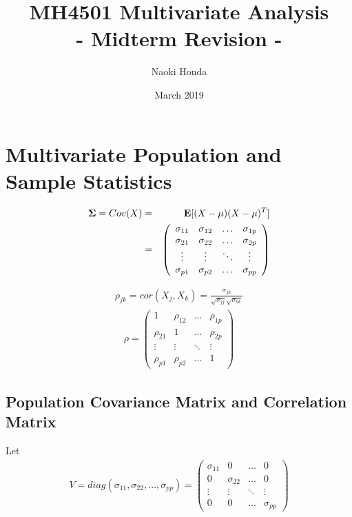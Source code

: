 \documentclass[12pt]{extarticle}
\title{\textbf{MH4501 Multivariate Analysis}\\
\Large - Midterm Revision -}
\author{Naoki Honda}
\date{March 2019}
\newcommand{\<}{\langle}
\renewcommand{\>}{\rangle}
\theoremstyle{definition}
\begin{document}
\maketitle


\section{Multivariate Population and Sample Statistics}
\begin{tcolorbox}[enhanced, drop fuzzy shadow, title=Population Covariance Matrix]
\begin{eqnarray*}
{\bf \Sigma} = Cov(X) &=& {\bf E}[(X-\mu)(X-\mu)^T]\\
&=& \left(
    \begin{array}{cccc}
      \sigma_{11} & \sigma_{12} & \ldots & \sigma_{1p} \\
      \sigma_{21} & \sigma_{22} & \ldots & \sigma_{2p} \\
      \vdots & \vdots & \ddots & \vdots \\
      \sigma_{p1} & \sigma_{p2} & \ldots & \sigma_{pp}
    \end{array} \right)
\end{eqnarray*} 
\end{tcolorbox}

\begin{tcolorbox}[enhanced, drop fuzzy shadow, title=Population Correlation Matrix]
\begin{eqnarray*}
\rho_{jk} = cor(X_j, X_k) = \frac{\sigma_{jk}}{\sqrt{\sigma_{jj}}\sqrt{\sigma_{kk}}}
\end{eqnarray*}
\begin{eqnarray*}
\rho = \left(
    \begin{array}{cccc}
      1 & \rho_{12} & \ldots & \rho_{1p} \\
      \rho_{21} & 1 & \ldots & \rho_{2p} \\
      \vdots & \vdots & \ddots & \vdots \\
      \rho_{p1} & \rho_{p2} & \ldots & 1
    \end{array} \right)
\end{eqnarray*}
\end{tcolorbox}

\newpage
\subsection{Population Covariance Matrix and Correlation Matrix}
Let
\begin{eqnarray*}
V = diag(\sigma_{11}, \sigma_{22}, ... , \sigma_{pp}) = \left(
    \begin{array}{cccc}
      \sigma_{11} & 0 & \ldots & 0 \\
      0 & \sigma_{22} & \ldots & 0 \\
      \vdots & \vdots & \ddots & \vdots \\
      0 & 0 & \ldots & \sigma_{pp}
    \end{array} \right) 
\end{eqnarray*}
\end{document}
